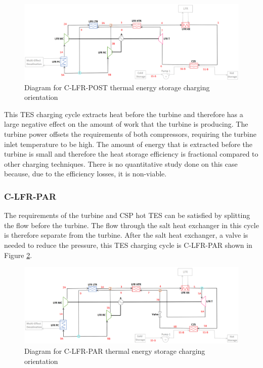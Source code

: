 \begin{figure}[H]
    \widefigure
    \includegraphics[width=\linewidth]{Definitions/c-lfr-post.pdf}
    \caption{Diagram for C-LFR-POST thermal energy storage charging orientation\label{c-lfr-post}}
\end{figure}
\begin{paracol}{2}
\linenumbers
\switchcolumn

This TES charging cycle extracts heat before the turbine and therefore has a large negative effect on the amount of work that the turbine is producing. The turbine power offsets the requirements of both compressors, requiring the turbine inlet temperature to be high. The amount of energy that is extracted before the turbine is small and therefore the heat storage efficiency is fractional compared to other charging techniques. There is no quantitative study done on this case because, due to the efficiency losses, it is non-viable. 


\subsubsection{C-LFR-PAR} 

The requirements of the turbine and CSP hot TES can be satisfied by splitting the flow before the turbine. The flow through the salt heat exchanger in this cycle is therefore separate from the turbine. After the salt heat exchanger, a valve is needed to reduce the pressure, this TES charging cycle is C-LFR-PAR shown in Figure \ref{c-lfr-par}.

\end{paracol}
\begin{figure}[H]
    \widefigure
    \includegraphics[width=\linewidth]{Definitions/c-lfr-par.pdf}
    \caption{Diagram for C-LFR-PAR thermal energy storage charging orientation\label{c-lfr-par}}
\end{figure}

